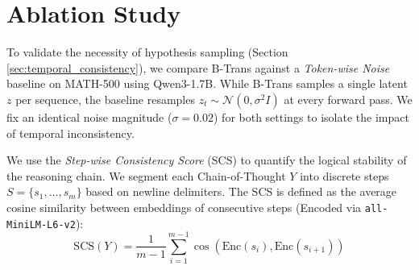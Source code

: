 \documentclass[11pt]{article}
\begin{document}
\begin{table}[h]
\centering
{}
\caption{Accuracy (\%) on RLVR tasks using GRPO. B-Trans consistently outperforms the baseline.}
\label{table:rlvr_results}
\end{table}


\section{Ablation Study}
\label{sec:ablation}

To validate the necessity of hypothesis sampling (Section \ref{sec:temporal_consistency}), we compare B-Trans against a \textit{Token-wise Noise} baseline on MATH-500 using Qwen3-1.7B. While B-Trans samples a single latent $z$ per sequence, the baseline resamples $z_t \sim \mathcal{N}(0, \sigma^2I)$ at every forward pass. We fix an identical noise magnitude ($\sigma=0.02$) for both settings to isolate the impact of temporal inconsistency.
 
We use the \textit{Step-wise Consistency Score} (SCS) to quantify the logical stability of the reasoning chain. We segment each Chain-of-Thought $Y$ into discrete steps $S = \{s_1, \dots, s_m\}$ based on newline delimiters. The SCS is defined as the average cosine similarity between embeddings of consecutive steps (Encoded via \texttt{all-MiniLM-L6-v2}):
\begin{equation}
    \text{SCS}(Y) = \frac{1}{m-1} \sum_{i=1}^{m-1} \cos(\text{Enc}(s_i), \text{Enc}(s_{i+1}))
\end{equation}
\end{document}
